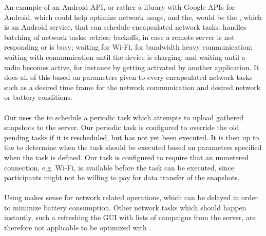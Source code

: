 
An example of an Android API, or rather a library with Google APIs for Android, which could help optimize network usage, and the, would be the , which is an Android service, that can schedule encapsulated network tasks.  \parencite{gcmnetworkmanager} handles batching of network tasks; retries; backoffs, in case a remote server is not responding or is busy; waiting for Wi-Fi, for bandwidth heavy communication; waiting with communication until the device is charging; and waiting until a radio becomes active, for instance by getting activated by another application. It does all of this based on parameters given to every encapsulated network tasks such as a desired time frame for the network communication and desired network or battery conditions.  
\\\\
Our  uses the  to schedule a periodic task which attempts to upload gathered snapshots to the server. Our periodic task is configured to override the old pending tasks if it is rescheduled, but has not yet been executed. It is then up to the  to determine when the task should be executed based on parameters specified when the task is defined. Our task is configured to require that an unmetered connection, e.g. Wi-Fi, is available before the task can be executed, since participants might not be willing to pay for data transfer of the snapshots. 
\\\\
Using  makes sense for network related operations, which can be delayed in order to minimize battery consumption. Other network tasks which should happen instantly, such a refreshing the GUI with lists of campaigns from the server, are therefore not applicable to be optimized with . 

